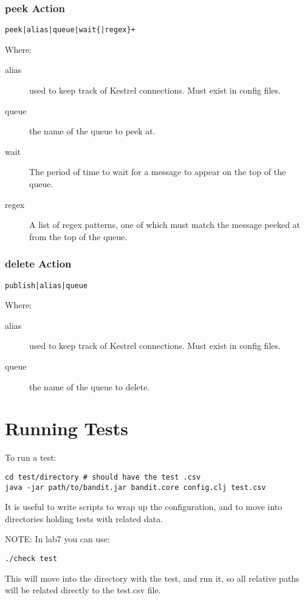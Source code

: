 \documentclass[12pt,a4paper,koma]{article}
\begin{document}
\subsubsection{peek Action}
\label{sec-7-2-5}
\begin{verbatim}
peek|alias|queue|wait{|regex}+
\end{verbatim}
Where:
\begin{description}
\item[{alias}] used to keep track of Kestrel connections. Must exist in
config files.
\item[{queue}] the name of the queue to peek at.
\item[{wait}] The period of time to wait for a message to appear on the
top of the queue.
\item[{regex}] A list of regex patterns, one of which must match the
message peeked at from the top of the queue.
\end{description}
\subsubsection{delete Action}
\label{sec-7-2-6}
\begin{verbatim}
publish|alias|queue
\end{verbatim}
Where:
\begin{description}
\item[{alias}] used to keep track of Kestrel connections. Must exist in
config files.
\item[{queue}] the name of the queue to delete.
\end{description}
\section{Running Tests}
\label{sec-8}
To run a test:
\begin{verbatim}
cd test/directory # should have the test .csv
java -jar path/to/bandit.jar bandit.core config.clj test.csv
\end{verbatim}

It is useful to write scripts to wrap up the configuration, and to move
into directories holding tests with related data.

NOTE: In lab7 you can use:

\begin{verbatim}
./check test
\end{verbatim}

This will move into the directory with the test, and run it, so all
relative paths will be related directly to the test.csv file.
\end{document}
